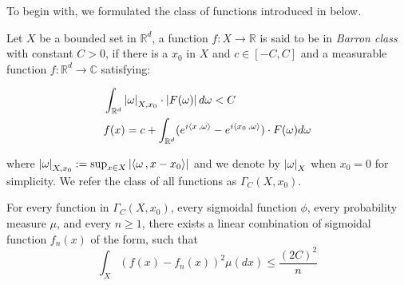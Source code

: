 To begin with, we formulated the class of functions introduced in
\cite{barronNeuralNetApproximation1992, barronUniversalApproximationBounds1993}
below.

\begin{definition}
    \label{def:fourier_class}
    Let $X$ be a bounded set in $\mathbb{R}^d$, a function $f: X \to \mathbb{R}$
    is said to be in \textit{Barron class} with constant $C > 0$, if there is a
    $x_0$ in $X$ and $c \in [-C, C]$ and a measurable function $f: \mathbb{R}^d
    \to \mathbb{C}$ satisfying:

    \begin{align}
         & \int_{\mathbb{R}^d} \left| \omega \right|_{X, x_0} \cdot \left| F(\omega) \right| d\omega < C                            \\
         & f(x) = c + \int_{\mathbb{R}^d} (e^{i\left\langle x\, , \omega \right\rangle} - e^{i\left\langle x_0\, , \omega \right\rangle}) \cdot F(\omega) d\omega
    \end{align}

    where $\left| \omega \right|_{X, x_0} := \sup_{x\in X}\left| \left\langle \omega\, , x - x_0 \right\rangle \right|$
    and we denote by $\left| \omega \right|_X$ when $x_0 = 0$ for simplicity. We refer
    the class of all functions as $\Gamma_C(X, x_0)$.
\end{definition}

\begin{theorem}\cite[Theorem~1]{barronUniversalApproximationBounds1993}\label{thm:barron_1993_1}
    For every function in $\Gamma_C(X, x_0)$, every sigmoidal function $\phi$,
    every probability measure $\mu$, and every $n \geq 1$, there exists a linear
    combination of sigmoidal function $f_n(x)$ of the form, such that
    \begin{equation}
        \int_X(f(x) - f_n(x))^2 \mu(dx) \leq \frac{(2C)^2}{n}
    \end{equation}
\end{theorem}


